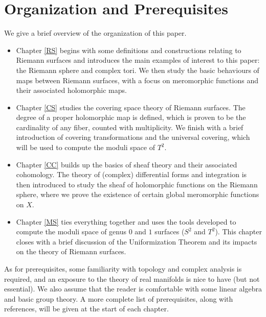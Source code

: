 \documentclass[../Moduli_Spaces_of_Riemann_Surfaces.tex]{subfiles}
\begin{document}
    \section{Organization and Prerequisites}
    We give a brief overview of the organization of this paper.
    \begin{itemize}
        \item Chapter \ref{RS} begins with some definitions and constructions relating to Riemann surfaces and introduces the main examples of interest to this paper: the Riemann sphere and complex tori. We then study the basic behaviours of maps between Riemann surfaces, with a focus on meromorphic functions and their associated holomorphic maps.
            \vspace{-0.05in}
        \item Chapter \ref{CS} studies the covering space theory of Riemann surfaces. The degree of a proper holomorphic map is defined, which is proven to be the cardinality of any fiber, counted with multiplicity. We finish with a brief introduction of covering transformations and the universal covering, which will be used to compute the moduli space of $T^2$.
            \vspace{-0.05in}
        \item Chapter \ref{CC} builds up the basics of sheaf theory and their associated cohomology. The theory of (complex) differential forms and integration is then introduced to study the sheaf of holomorphic functions on the Riemann sphere, where we prove the existence of certain global meromorphic functions on $X$.
            \vspace{-0.05in}
        \item Chapter \ref{MS} ties everything together and uses the tools developed to compute the moduli space of genus $0$ and $1$ surfaces ($S^2$ and $T^2$). This chapter closes with a brief discussion of the Uniformization Theorem and its impacts on the theory of Riemann surfaces.
    \end{itemize}
    As for prerequisites, some familiarity with topology and complex analysis is required, and an exposure to the theory of real manifolds is nice to have (but not essential). We also assume that the reader is comfortable with some linear algebra and basic group theory. A more complete list of prerequisites, along with references, will be given at the start of each chapter.
\end{document}

